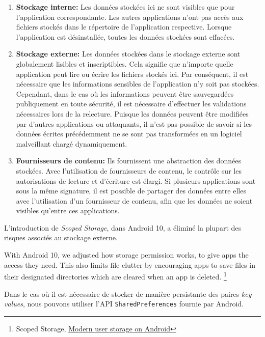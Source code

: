 \documentclass[
  french,
  paper=a4,
  ,captions=tableheading
]{scrartcl}
\renewenvironment{quote}{\begin{customblockquote}\list{}{\rightmargin=0em\leftmargin=0em}%
\item\relax\color{blockquote-text}\ignorespaces}{\unskip\unskip\endlist\end{customblockquote}}
\begin{document}
\begin{enumerate}
\def\labelenumi{\arabic{enumi}.}
\item
  \textbf{Stockage interne:} Les données stockées ici ne sont visibles
  que pour l'application correspondante. Les autres applications n'ont
  pas accès aux fichiers stockés dans le répertoire de l'application
  respective. Lorsque l'application est désinstallée, toutes les données
  stockées sont effacées.
\item
  \textbf{Stockage externe:} Les données stockées dans le stockage
  externe sont globalement lisibles et inscriptibles. Cela signifie que
  n'importe quelle application peut lire ou écrire les fichiers stockés
  ici. Par conséquent, il est nécessaire que les informations sensibles
  de l'application n'y soit pas stockées. Cependant, dans le cas où les
  informations peuvent être sauvegardées publiquement en toute sécurité,
  il est nécessaire d'effectuer les validations nécessaires lors de la
  relecture. Puisque les données peuvent être modifiées par d'autres
  applications ou attaquants, il n'est pas possible de savoir si les
  données écrites précédemment ne se sont pas transformées en un
  logiciel malveillant chargé dynamiquement.
\item
  \textbf{Fournisseurs de contenu:} Ils fournissent une abstraction des
  données stockées. Avec l'utilisation de fournisseurs de contenu, le
  contrôle sur les autorisations de lecture et d'écriture est élargi. Si
  plusieurs applications sont sous la même signature, il est possible de
  partager des données entre elles avec l'utilisation d'un fournisseur
  de contenu, afin que les données ne soient visibles qu'entre ces
  applications.
\end{enumerate}

L'introduction de \emph{Scoped Storage}, dans Android 10, a éliminé la
plupart des risques associés au stockage externe.

\begin{quote}
With Android 10, we adjusted how storage permission works, to give apps
the access they need. This also limits file clutter by encouraging apps
to save files in their designated directories which are cleared when an
app is deleted. \footnote{Scoped Storage,
  \href{https://medium.com/androiddevelopers/modern-user-storage-on-android-e9469e8624f9}{Modern
  user storage on Android}}
\end{quote}

Dans le cas où il est nécessaire de stocker de manière persistante des
paires \emph{key-values}, nous pouvons utiliser l'API
\texttt{SharedPreferences} fournie par Android.
\end{document}
